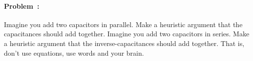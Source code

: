 \documentclass[12pt]{article}
\begin{document}
\paragraph{Problem~\theproblem:}%
Imagine you add two capacitors in parallel. Make a heuristic argument
that the capacitances should add together. Imagine you add two capacitors
in series. Make a heuristic argument that the inverse-capacitances should
add together. That is, don't use equations, use words and your brain.
\end{document}
